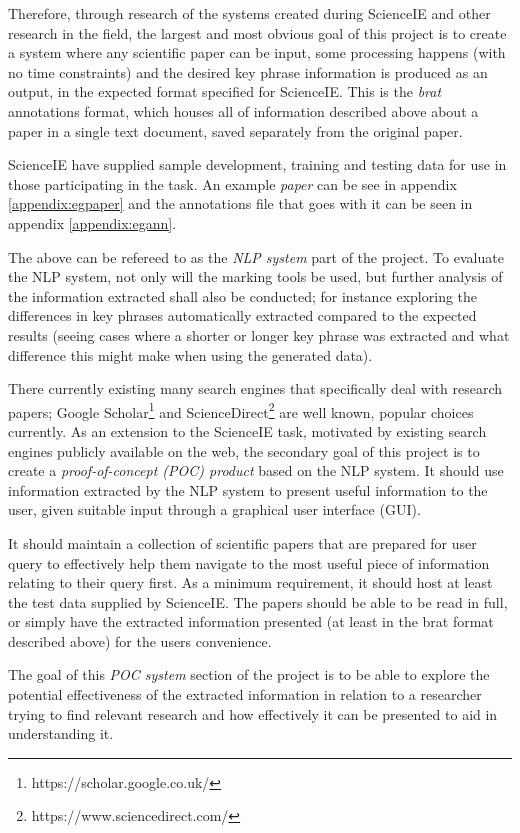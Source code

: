 Therefore, through research of the systems created during ScienceIE and other research in the field, the largest and most obvious goal of this project is to create a system where any scientific paper can be input, some processing happens (with no time constraints) and the desired key phrase information is produced as an output, in the expected format specified for ScienceIE. This is the \textit{brat} annotations format, which houses all of information described above about a paper in a single text document, saved separately from the original paper. 

ScienceIE have supplied sample development, training and testing data for use in those participating in the task. An example \textit{paper} can be see in appendix \ref{appendix:egpaper} and the annotations file that goes with it can be seen in appendix \ref{appendix:egann}.

The above can be refereed to as the \textit{NLP system} part of the project. To evaluate the NLP system, not only will the marking tools be used, but further analysis of the information extracted shall also be conducted; for instance exploring the differences in key phrases automatically extracted compared to the expected results (seeing cases where a shorter or longer key phrase was extracted and what difference this might make when using the generated data).

There currently existing many search engines that specifically deal with research papers; Google Scholar\footnote{https://scholar.google.co.uk/} and ScienceDirect\footnote{https://www.sciencedirect.com/} are well known, popular choices currently. As an extension to the ScienceIE task, motivated by existing search engines publicly available on the web, the secondary goal of this project is to create a \textit{proof-of-concept (POC) product} based on the NLP system. It should use information extracted by the NLP system to present useful information to the user, given suitable input through a graphical user interface (GUI). 

It should maintain a collection of scientific papers that are prepared for user query to effectively help them navigate to the most useful piece of information relating to their query first. As a minimum requirement, it should host at least the test data supplied by ScienceIE. The papers should be able to be read in full, or simply have the extracted information presented (at least in the brat format described above) for the users convenience.

The goal of this \textit{POC system} section of the project is to be able to explore the potential effectiveness of the extracted information in relation to a researcher trying to find relevant research and how effectively it can be presented to aid in understanding it. 

